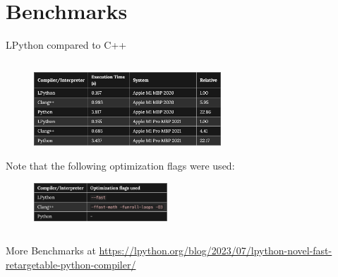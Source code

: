 \section{Benchmarks}
    
\begin{frame}{LPython compared to C++}
    \begin{columns}
        \begin{column}{0.6\textwidth}
            \begin{figure}
                \centering
                \includegraphics[width=7cm]{images/benchmark.png}
            \end{figure}
            \scriptsize \centering Note that the following optimization flags were used:
            \begin{figure}
                \centering
                \includegraphics[width=5cm]{images/optimization-flags.png}
            \end{figure}
        \end{column}
    \end{columns}
    \scriptsize
    More Benchmarks at \href{https://lpython.org/blog/2023/07/lpython-novel-fast-retargetable-python-compiler/}{https://lpython.org/blog/2023/07/lpython-novel-fast-retargetable-python-compiler/}
\end{frame}